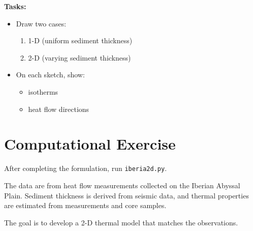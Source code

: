 \documentclass[final,a4paper,12pt]{article}
\begin{document}
\begin{enumerate}
\textbf{Tasks:}
\begin{itemize}
    \item Draw two cases:
    \begin{enumerate}
        \item 1-D (uniform sediment thickness)
        \item 2-D (varying sediment thickness)
    \end{enumerate}
    \item On each sketch, show:
    \begin{itemize}
        \item isotherms
        \item heat flow directions
    \end{itemize}
\end{itemize}

\end{enumerate}

\bigskip
\section{Computational Exercise}

After completing the formulation, run \verb+iberia2d.py+.

The data are from heat flow measurements collected on the Iberian Abyssal Plain.
Sediment thickness is derived from seismic data, and thermal properties are
estimated from measurements and core samples.

The goal is to develop a 2-D thermal model that matches the observations.

\bigskip
\end{document}
